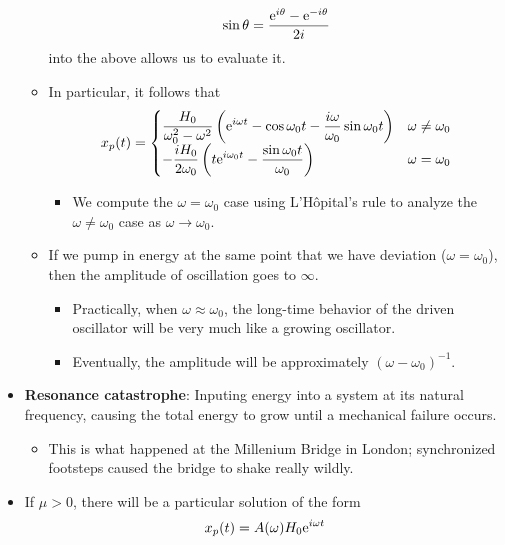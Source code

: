 \documentclass[../notes.tex]{subfiles}
\begin{document}
\begin{itemize}
\begin{itemize}
\begin{equation*}
            \sin\theta = \frac{\e[i\theta]-\e[-i\theta]}{2i}
        \end{equation*}
        into the above allows us to evaluate it.
        \item In particular, it follows that
        \begin{equation*}
            x_p(t) =
            \begin{cases}
                \displaystyle\frac{H_0}{\omega_0^2-\omega^2}\left( \e[i\omega t]-\cos\omega_0t-\frac{i\omega}{\omega_0}\sin\omega_0t \right) & \omega\neq\omega_0\\
                \displaystyle -\frac{iH_0}{2\omega_0}\left( t\e[i\omega_0t]-\frac{\sin\omega_0t}{\omega_0} \right) & \omega=\omega_0
            \end{cases}
        \end{equation*}
        \begin{itemize}
            \item We compute the $\omega=\omega_0$ case using L'H\^{o}pital's rule to analyze the $\omega\neq\omega_0$ case as $\omega\to\omega_0$.
        \end{itemize}
        \item If we pump in energy at the same point that we have deviation ($\omega=\omega_0$), then the amplitude of oscillation goes to $\infty$.
        \begin{itemize}
            \item Practically, when $\omega\approx\omega_0$, the long-time behavior of the driven oscillator will be very much like a growing oscillator.
            \item Eventually, the amplitude will be approximately $(\omega-\omega_0)^{-1}$.
        \end{itemize}
    \end{itemize}
    \item \textbf{Resonance catastrophe}: Inputing energy into a system at its natural frequency, causing the total energy to grow until a mechanical failure occurs.
    \begin{itemize}
        \item This is what happened at the Millenium Bridge in London; synchronized footsteps caused the bridge to shake really wildly.
    \end{itemize}
    \item If $\mu>0$, there will be a particular solution of the form
    \begin{equation*}
        x_p(t) = A(\omega)H_0\e[i\omega t]

\end{equation*}
\end{itemize}
\end{document}
